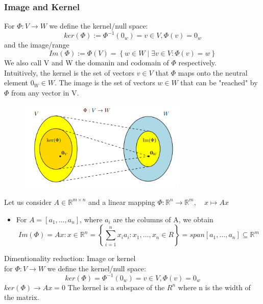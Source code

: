 \subsubsection*{Image and Kernel}
\begin{definition}
    For $\Phi : V \rightarrow W$ we define the kernel/null space:
    \[ 
        ker(\Phi) := \Phi^{-1}(0_w) = {v \in V, \Phi(v) = 0_w} 
    \]and the image/range
    \[ 
         Im(\Phi) := \Phi(V) = \left\{ w \in W \mid \exists v \in V : \Phi(v) = w \right\}
    \]
    We also call V and W the domanin and codomain of $\Phi$ respectively.\\
    Intuitively, the kernel is the set of vectors $v\in V$ that $\Phi$ maps onto the neutral element $0_W \in W$. The image is the set of vectors $w \in W$ that can be "reached" by $\Phi$ from any vector in V.
    \begin{figure}[htbp]
        \centering
        \includegraphics[width=8cm]{Mathematical Background/image-kernel.png}
    \end{figure}
\end{definition}
\begin{remark}
    Let us consider $A \in \mathbb{R}^{m\times n}$ and a linear mapping $\Phi: \mathbb{R}^n \longrightarrow \mathbb{R}^m, \quad x \mapsto Ax$
    \begin{itemize}
        \item For $A=[a_{1}, \ldots,a_{n}]$, where $a_i$ are the columns of A, we obtain
        \[ 
            Im(\Phi) = {Ax: x \in \mathbb{R}^n} = \left\{ \sum_{i=1}^{n}{x_ia_i}:x_{1}, \ldots,x_{n}\in R \right\} = span[a_{1}, \ldots,a_{n}]\subseteq \mathbb{R}^m
        \]
    \end{itemize}
\end{remark}
Dimentionality reduction:
Image or kernel\\
for $\Phi : V \rightarrow W$ we define the kernel/null space:
$$ker(\Phi) = \Phi^{-1}(0_w) = {v \in V, \Phi(v) = 0_w}$$
$ ker(\Phi) \rightarrow Ax = 0 $ 
The kernel is a subspace of the $ R^n $ where n is the width of the matrix.  
